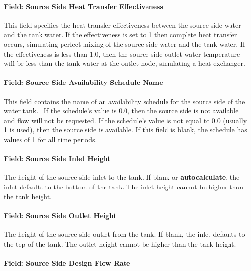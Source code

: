 \paragraph{Field: Source Side Heat Transfer Effectiveness}\label{field-source-side-heat-transfer-effectiveness-1}

This field specifies the heat transfer effectiveness between the source side water and the tank water. If the effectiveness is set to 1 then complete heat transfer occurs, simulating perfect mixing of the source side water and the tank water. If the effectiveness is less than 1.0, then the source side outlet water temperature will be less than the tank water at the outlet node, simulating a heat exchanger.

\paragraph{Field: Source Side Availability Schedule Name}\label{field-source-side-availability-schedule-name-1}

This field contains the name of an availability schedule for the source side of the water tank.~ If the schedule's value is 0.0, then the source side is not available and flow will not be requested. If the schedule's value is not equal to 0.0 (usually 1 is used), then the source side is available. If this field is blank, the schedule has values of 1 for all time periods.

\paragraph{Field: Source Side Inlet Height}\label{field-source-side-inlet-height}

The height of the source side inlet to the tank. If blank or \textbf{autocalculate}, the inlet defaults to the bottom of the tank. The inlet height cannot be higher than the tank height.

\paragraph{Field: Source Side Outlet Height}\label{field-source-side-outlet-height}

The height of the source side outlet from the tank. If blank, the inlet defaults to the top of the tank. The outlet height cannot be higher than the tank height.

\paragraph{Field: Source Side Design Flow Rate}\label{field-source-side-design-flow-rate-1}


